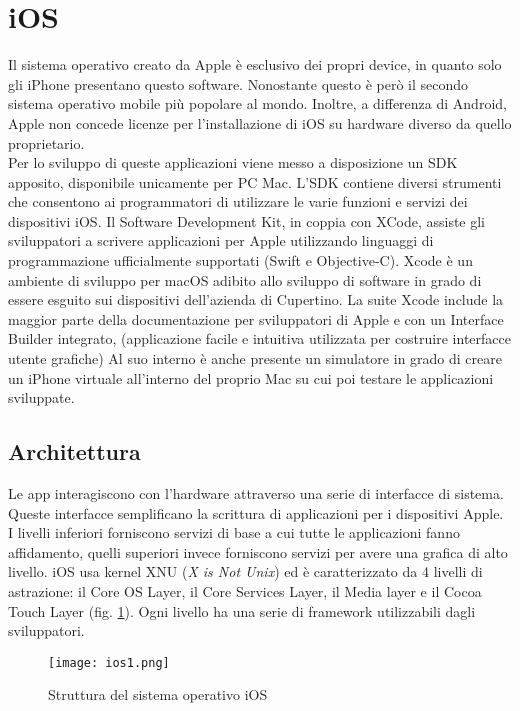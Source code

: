 \section{iOS}
Il sistema operativo creato da Apple è esclusivo dei propri device, in quanto
solo gli iPhone presentano questo software. Nonostante questo è però il secondo
sistema operativo mobile più popolare al mondo. Inoltre, a differenza di Android, Apple
non concede licenze per l’installazione di iOS su hardware diverso da quello
proprietario. \\
Per lo sviluppo di queste applicazioni viene messo a disposizione un SDK apposito,
disponibile unicamente per PC Mac. L’SDK contiene diversi strumenti che
consentono ai programmatori di utilizzare le varie funzioni e servizi dei
dispositivi iOS. Il Software Development Kit, in coppia con XCode, assiste gli
sviluppatori a scrivere
applicazioni per Apple utilizzando linguaggi di programmazione ufficialmente
supportati (Swift
e Objective-C). Xcode è un ambiente di sviluppo per macOS adibito allo sviluppo
di software in grado di essere esguito sui dispositivi dell'azienda di
Cupertino. La suite Xcode include la maggior parte
della documentazione per sviluppatori di Apple e con un Interface Builder integrato,
(applicazione facile e intuitiva utilizzata per costruire interfacce utente
grafiche) Al suo interno è anche presente un simulatore in grado di creare un
iPhone virtuale all'interno del proprio Mac su cui poi testare le applicazioni
sviluppate.
\subsection{Architettura}
Le app interagiscono con l’hardware attraverso una serie di interfacce di
sistema. Queste interfacce semplificano la scrittura di applicazioni per i
dispositivi Apple. I livelli inferiori forniscono servizi di base a cui tutte le
applicazioni fanno affidamento, quelli superiori invece forniscono servizi
per avere una grafica di alto livello. iOS usa kernel XNU (\textit{X is Not
Unix}) ed è caratterizzato da
4 livelli di astrazione: il Core OS Layer, il Core Services Layer, il Media layer e
il Cocoa Touch Layer (fig. \ref{ios1}). Ogni livello ha una serie di framework
utilizzabili dagli sviluppatori. 
\begin{figure}[!h]
    \centering
    \texttt{[image: ios1.png]}
    \caption{Struttura del sistema operativo iOS}
    \label{ios1}
\end{figure}


